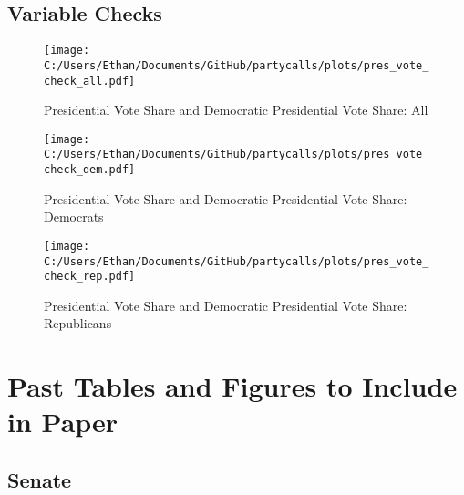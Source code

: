 \documentclass[12pt]{article}
\begin{document}
\clearpage

\subsection{Variable Checks}

\begin{figure}[H]
\centering
\caption{Presidential Vote Share and Democratic Presidential Vote Share: All}
\texttt{[image: C:/Users/Ethan/Documents/GitHub/partycalls/plots/pres\_vote\_check\_all.pdf]}
\end{figure}

\begin{figure}[H]
	\centering
	\caption{Presidential Vote Share and Democratic Presidential Vote Share: Democrats}
	\texttt{[image: C:/Users/Ethan/Documents/GitHub/partycalls/plots/pres\_vote\_check\_dem.pdf]}
\end{figure}

\begin{figure}[H]
	\centering
	\caption{Presidential Vote Share and Democratic Presidential Vote Share: Republicans}
	\texttt{[image: C:/Users/Ethan/Documents/GitHub/partycalls/plots/pres\_vote\_check\_rep.pdf]}
\end{figure}

\clearpage

\section{Past Tables and Figures to Include in Paper}

\subsection{Senate}
\end{document}
